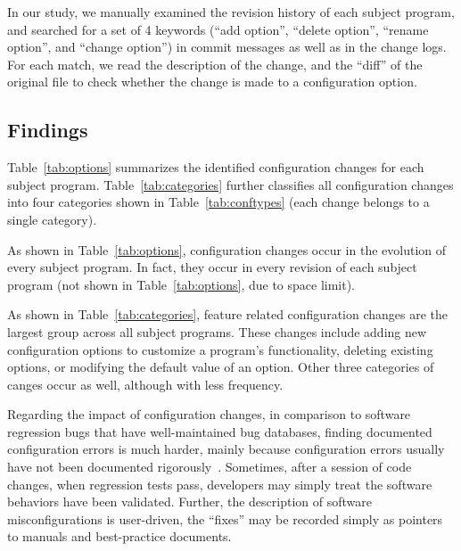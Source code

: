 In our study, %
we manually examined the revision history of each subject program,
and searched for a set of 4 keywords (``add option'',
``delete option'', ``rename option'', and ``change option'')
in commit messages as well as in the change logs.
For each match, we read the description of the change,
and the ``diff'' of the original file to check whether
the change is made to a configuration option.




\subsection{Findings}

Table~\ref{tab:options} summarizes the identified
configuration changes for each subject program.
Table~\ref{tab:categories} further classifies all
configuration changes into four categories shown
in Table~\ref{tab:conftypes} (each change belongs to a single category).


As shown in Table~\ref{tab:options}, configuration changes occur
in the evolution of every subject program. In fact, they occur in
every revision of each subject program (not shown in Table~\ref{tab:options},
due to space limit). 

As shown in Table~\ref{tab:categories},
feature related configuration changes are the largest group across
all subject programs. These changes include
adding new configuration options to customize a program's
functionality, deleting existing options, or modifying the default
value of an option. Other three categories of canges occur as well, although
with less frequency.

Regarding the impact of configuration changes, 
in comparison to software regression bugs that have well-maintained
bug databases, finding documented configuration errors
is much harder, mainly
because configuration errors usually have not been
documented rigorously~\cite{Yin:2011:ESC}. Sometimes, after a
session of code changes, when
regression tests pass, developers may simply treat the
software behaviors have been validated. Further,
the description of software misconfigurations is user-driven,
the ``fixes'' may be recorded simply as pointers
to manuals and best-practice documents.

